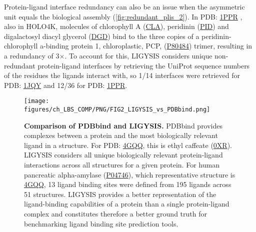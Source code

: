 Protein-ligand interface redundancy can also be an issue when the asymmetric unit equals the biological assembly (\autoref{fig:redundant_plis_2}). In PDB: \href{https://www.ebi.ac.uk/pdbe/entry/pdb/1PPR}{1PPR} \cite{HOFMANN_1996_CAROTENOID}, also in HOLO4K, molecules of chlorophyll A (\href{https://www.ebi.ac.uk/pdbe-srv/pdbechem/chemicalCompound/show/CLA}{CLA}), peridinin (\href{https://www.ebi.ac.uk/pdbe-srv/pdbechem/chemicalCompound/show/PID}{PID}) and digalactosyl diacyl glycerol (\href{https://www.ebi.ac.uk/pdbe-srv/pdbechem/chemicalCompound/show/DGD}{DGD}) bind to the three copies of a peridinin-chlorophyll a-binding protein 1, chloroplastic, PCP, (\href{https://www.uniprot.org/uniprotkb/P80484/entry}{P80484}) trimer, resulting in a redundancy of 3$\times$. To account for this, LIGYSIS considers unique non-redundant protein-ligand interfaces by retrieving the UniProt sequence numbers of the residues the ligands interact with, so 1/14 interfaces were retrieved for PDB: \href{https://www.ebi.ac.uk/pdbe/entry/pdb/1JQY}{1JQY} and 12/36 for PDB: \href{https://www.ebi.ac.uk/pdbe/entry/pdb/1PPR}{1PPR}. %

\begin{figure}[htb!]
    \centering
    \texttt{[image: figures/ch\_LBS\_COMP/PNG/FIG2\_LIGYSIS\_vs\_PDBbind.png]}
    \caption[Comparison of PDBbind and LIGYSIS]{\textbf{Comparison of PDBbind and LIGYSIS.} PDBbind provides complexes between a protein and the most biologically relevant ligand in a structure. For PDB: \href{https://www.ebi.ac.uk/pdbe/entry/pdb/4GQQ}{4GQQ}, this is ethyl caffeate (\href{https://www.ebi.ac.uk/pdbe-srv/pdbechem/chemicalCompound/show/0XR}{0XR}). LIGYSIS considers all unique biologically relevant protein-ligand interactions across all structures for a given protein. For human pancreatic alpha-amylase (\href{https://www.uniprot.org/uniprotkb/P04746/entry}{P04746}), which representative structure is \href{https://www.ebi.ac.uk/pdbe/entry/pdb/4GQQ}{4GQQ}, 13 ligand binding sites were defined from 195 ligands across 51 structures. LIGYSIS provides a better representation of the ligand-binding capabilities of a protein than a single protein-ligand complex and constitutes therefore a better ground truth for benchmarking ligand binding site prediction tools.}
    \label{fig:PDBbind_VS_LIGYSIS}
\end{figure}

